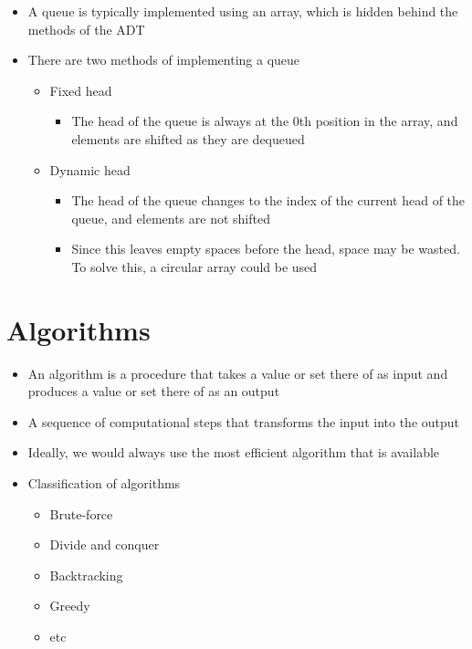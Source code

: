 \begin{itemize}
\begin{itemize}
\begin{itemize}
    \end{itemize}
    \item A queue is typically implemented using an array, which is hidden behind the methods of the ADT
    \item There are two methods of implementing a queue
    \begin{itemize}
      \item Fixed head
      \begin{itemize}
        \item The head of the queue is always at the 0th position in the array, and elements are shifted as they are dequeued
      \end{itemize}
      \item Dynamic head
      \begin{itemize}
        \item The head of the queue changes to the index of the current head of the queue, and elements are not shifted
        \item Since this leaves empty spaces before the head, space may be wasted. To solve this, a circular array could be used
      \end{itemize}
    \end{itemize}
  \end{itemize}
\end{itemize}

\section*{Algorithms}

\begin{itemize}
  \item An algorithm is a procedure that takes a value or set there of as input and produces a value or set there of as an output
  \item A sequence of computational steps that transforms the input into the output
  \item Ideally, we would always use the most efficient algorithm that is available
  \item Classification of algorithms
  \begin{itemize}
    \item Brute-force
    \item Divide and conquer
    \item Backtracking
    \item Greedy
    \item etc
  \end{itemize}
\end{itemize}

